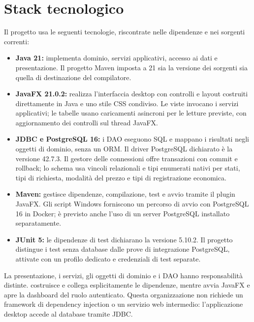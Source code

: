 \clearpage
\section{Stack tecnologico}
Il progetto usa le seguenti tecnologie, riscontrate nelle dipendenze e nei sorgenti correnti:
\begin{itemize}
  \item \textbf{Java 21:} implementa dominio, servizi applicativi, accesso ai dati e presentazione. Il progetto Maven imposta a 21 sia la versione dei sorgenti sia quella di destinazione del compilatore.
  \item \textbf{JavaFX 21.0.2:} realizza l'interfaccia desktop con controlli e layout costruiti direttamente in Java e uno stile CSS condiviso. Le viste invocano i servizi applicativi; le tabelle usano caricamenti asincroni per le letture previste, con aggiornamento dei controlli sul thread JavaFX.
  \item \textbf{JDBC e PostgreSQL 16:} i DAO eseguono SQL e mappano i risultati negli oggetti di dominio, senza un ORM. Il driver PostgreSQL dichiarato è la versione 42.7.3. Il gestore delle connessioni offre transazioni con commit e rollback; lo schema usa vincoli relazionali e tipi enumerati nativi per stati, tipi di richiesta, modalità del prezzo e tipi di registrazione economica.
  \item \textbf{Maven:} gestisce dipendenze, compilazione, test e avvio tramite il plugin JavaFX. Gli script Windows forniscono un percorso di avvio con PostgreSQL 16 in Docker; è previsto anche l'uso di un server PostgreSQL installato separatamente.
  \item \textbf{JUnit 5:} le dipendenze di test dichiarano la versione 5.10.2. Il progetto distingue i test senza database dalle prove di integrazione PostgreSQL, attivate con un profilo dedicato e credenziali di test separate.
\end{itemize}

La presentazione, i servizi, gli oggetti di dominio e i DAO hanno responsabilità distinte.  costruisce e collega esplicitamente le dipendenze, mentre  avvia JavaFX e apre la dashboard del ruolo autenticato. Questa organizzazione non richiede un framework di dependency injection o un servizio web intermedio: l'applicazione desktop accede al database tramite JDBC.

\clearpage
